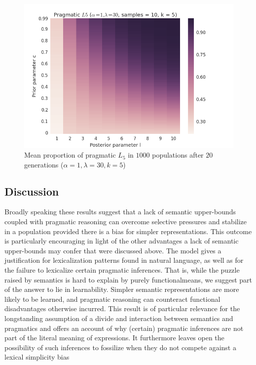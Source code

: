 \documentclass[a4paper]{article}
\newcommand{\hl}[1]{\textcolor[rgb]{.8,.33,.0}{#1}}%
\begin{document}
\begin{figure}
\centering
\includegraphics[scale=.5]{../presentations/01heatmap}
\caption{Mean proportion of pragmatic $L_5$ in $1000$ populations after $20$ generations ($\alpha = 1, \lambda = 30, k = 5$)}
\label{fig:prior-posterior}
\end{figure}



\subsection{Discussion}
Broadly speaking these results suggest that a lack of semantic upper-bounds coupled with pragmatic reasoning can overcome selective pressures and stabilize in a population provided there is a bias for simpler representations. This outcome is particularly encouraging in light of the other advantages a lack of semantic upper-bounds may confer that were discussed above. 
\hl{The model gives a justification for lexicalization patterns found in natural language, as well as for the failure to lexicalize certain pragmatic inferences. That is, while the puzzle raised by semantics is hard to explain by purely functionalmeans,  we  suggest  part  of  the  answer  to  lie  in  learnability.   Simpler semantic representations are more likely to be learned,  and pragmatic reasoning can counteract functional disadvantages otherwise incurred.  This result is of particular relevance for the longstanding assumption of a divide and interaction between semantics and pragmatics and offers an account of why (certain) pragmatic inferences are not part of the literal meaning of expressions. It furthermore leaves open the possibility of such inferences to fossilize when they do not compete against a lexical simplicity bias}
\end{document}
